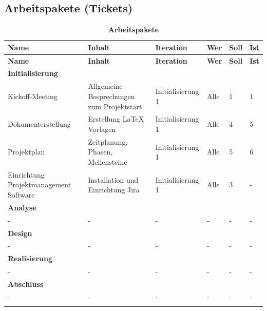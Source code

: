 \begin{landscape}
\subsection{Arbeitspakete (Tickets)}
\begin{longtable}{ p{5.5cm} p{8cm} l l p{1cm} p{1cm} }

\hline 
\multicolumn{1}{p{5.5cm}}{\textbf{Name}} & \multicolumn{1}{p{8cm}}{\textbf{Inhalt}} & \multicolumn{1}{l}{\textbf{Iteration}} & \multicolumn{1}{l}{\textbf{Wer}} & \multicolumn{1}{p{1cm}}{\textbf{Soll}} & \multicolumn{1}{p{1cm}}{\textbf{Ist}} \\ \hline 
\endfirsthead


\hline 
\multicolumn{1}{p{5.5cm}}{\textbf{Name}} & \multicolumn{1}{p{8cm}}{\textbf{Inhalt}} & \multicolumn{1}{l}{\textbf{Iteration}} & \multicolumn{1}{l}{\textbf{Wer}} & \multicolumn{1}{p{1cm}}{\textbf{Soll}} & \multicolumn{1}{p{1cm}}{\textbf{Ist}} \\ \hline 
\endhead


\textbf{Initialisierung}&&&&\\ \addlinespace
Kickoff-Meeting & Allgemeine Besprechungen zum Projektstart & Initialisierung 1 & Alle & 1 & 1 \\ \addlinespace
Dokumenterstellung & Erstellung \LaTeX{} Vorlagen & Initialisierung 1 & Alle & 4 & 5 \\ \addlinespace
Projektplan & Zeitplanung, Phasen, Meilensteine & Initialisierung 1 & Alle & 5 & 6 \\ \addlinespace
Einrichtung Projektmanagement Software & Installation und Einrichtung Jira & Initialisierung 1 & Alle & 3 & - \\ \addlinespace
\textbf{Analyse}&&&&\\ \addlinespace
- & - & - & - & - & -\\ \addlinespace
\textbf{Design}&&&&\\ \addlinespace
- & - & - & - & - & -\\ \addlinespace
\textbf{Realisierung}&&&&\\ \addlinespace
- & - & - & - & - & -\\ \addlinespace
\textbf{Abschluss}&&&&\\ \addlinespace
- & - & - & - & - & -\\ \addlinespace


 \addlinespace


\hline\caption{\textbf{Arbeitspakete}}
\end{longtable}
\end{landscape}

